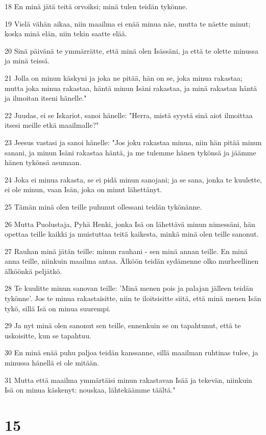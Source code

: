 \par 18 En minä jätä teitä orvoiksi; minä tulen teidän tykönne.
\par 19 Vielä vähän aikaa, niin maailma ei enää minua näe, mutta te näette minut; koska minä elän, niin tekin saatte elää.
\par 20 Sinä päivänä te ymmärrätte, että minä olen Isässäni, ja että te olette minussa ja minä teissä.
\par 21 Jolla on minun käskyni ja joka ne pitää, hän on se, joka minua rakastaa; mutta joka minua rakastaa, häntä minun Isäni rakastaa, ja minä rakastan häntä ja ilmoitan itseni hänelle."
\par 22 Juudas, ei se Iskariot, sanoi hänelle: "Herra, mistä syystä sinä aiot ilmoittaa itsesi meille etkä maailmalle?"
\par 23 Jeesus vastasi ja sanoi hänelle: "Jos joku rakastaa minua, niin hän pitää minun sanani, ja minun Isäni rakastaa häntä, ja me tulemme hänen tykönsä ja jäämme hänen tykönsä asumaan.
\par 24 Joka ei minua rakasta, se ei pidä minun sanojani; ja se sana, jonka te kuulette, ei ole minun, vaan Isän, joka on minut lähettänyt.
\par 25 Tämän minä olen teille puhunut ollessani teidän tykönänne.
\par 26 Mutta Puolustaja, Pyhä Henki, jonka Isä on lähettävä minun nimessäni, hän opettaa teille kaikki ja muistuttaa teitä kaikesta, minkä minä olen teille sanonut.
\par 27 Rauhan minä jätän teille: minun rauhani - sen minä annan teille. En minä anna teille, niinkuin maailma antaa. Älköön teidän sydämenne olko murheellinen älköönkä peljätkö.
\par 28 Te kuulitte minun sanovan teille: 'Minä menen pois ja palajan jälleen teidän tykönne'. Jos te minua rakastaisitte, niin te iloitsisitte siitä, että minä menen Isän tykö, sillä Isä on minua suurempi.
\par 29 Ja nyt minä olen sanonut sen teille, ennenkuin se on tapahtunut, että te uskoisitte, kun se tapahtuu.
\par 30 En minä enää puhu paljoa teidän kanssanne, sillä maailman ruhtinas tulee, ja minussa hänellä ei ole mitään.
\par 31 Mutta että maailma ymmärtäisi minun rakastavan Isää ja tekevän, niinkuin Isä on minua käskenyt: nouskaa, lähtekäämme täältä."

\chapter{15}

